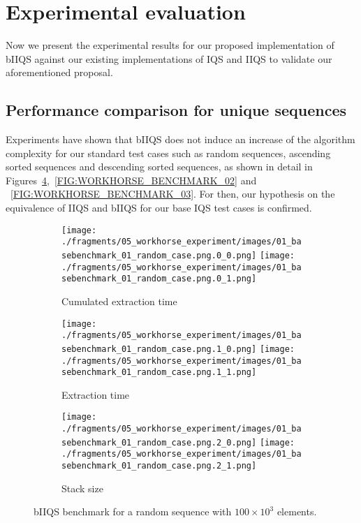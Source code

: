\section{Experimental evaluation}

Now we present the experimental results for our proposed implementation of bIIQS against our existing implementations of IQS and IIQS to validate our aforementioned proposal.\\


\subsection{Performance comparison for unique sequences}

Experiments have shown that bIIQS does not induce an increase of the algorithm complexity for our standard test cases such as random sequences, ascending sorted sequences and descending sorted sequences, as shown in detail in Figures~\ref{FIG:WORKHORSE_BENCHMARK_01},~\ref{FIG:WORKHORSE_BENCHMARK_02} and ~\ref{FIG:WORKHORSE_BENCHMARK_03}. For then, our hypothesis on the equivalence of IIQS and bIIQS for our base IQS test cases is confirmed. \\


\begin{figure}

    \centering
    \begin{subfigure}[b]{\textwidth}
        \centering
        \texttt{[image: ./fragments/05\_workhorse\_experiment/images/01\_basebenchmark\_01\_random\_case.png.0\_0.png]}
        \texttt{[image: ./fragments/05\_workhorse\_experiment/images/01\_basebenchmark\_01\_random\_case.png.0\_1.png]}
        \caption{Cumulated extraction time}
        \label{FIG:WORKHORSE_BENCHMARK_01__0_0}
    \end{subfigure}

    \begin{subfigure}[b]{\textwidth}
        \centering
        \texttt{[image: ./fragments/05\_workhorse\_experiment/images/01\_basebenchmark\_01\_random\_case.png.1\_0.png]}
        \texttt{[image: ./fragments/05\_workhorse\_experiment/images/01\_basebenchmark\_01\_random\_case.png.1\_1.png]}
        \caption{Extraction time}
        \label{FIG:WORKHORSE_BENCHMARK_01__0_1}
    \end{subfigure}

    \begin{subfigure}[b]{\textwidth}
        \centering
        \texttt{[image: ./fragments/05\_workhorse\_experiment/images/01\_basebenchmark\_01\_random\_case.png.2\_0.png]}
        \texttt{[image: ./fragments/05\_workhorse\_experiment/images/01\_basebenchmark\_01\_random\_case.png.2\_1.png]}
        \caption{Stack size}
        \label{FIG:WORKHORSE_BENCHMARK_01__0_2}
    \end{subfigure}
    
    \caption{bIIQS benchmark for a random sequence with $100\times10^3$ elements.}
       \label{FIG:WORKHORSE_BENCHMARK_01}
\end{figure}


